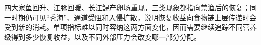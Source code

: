 四大家鱼回升、江豚回暖、长江鲟产卵场重现，三类现象都指向禁渔后的恢复；同一时期仍可见“秃海”、通道受阻和入侵扩散，说明恢复收益向食物链上层传递时会受到新的消耗。单项指标难以同时容纳这两方面变化，因而需要继续追踪不同营养级得到多少恢复收益，以及不同外部压力会改变哪一部分分配。
